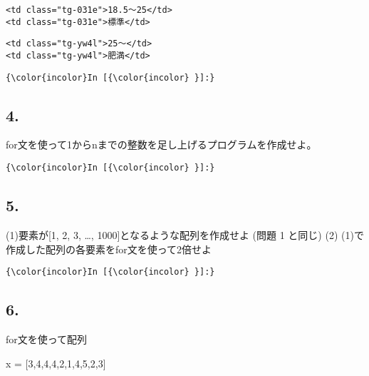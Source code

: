\documentclass[a4paper,dvipdfmx,uplatex]{jsarticle}
\newenvironment{Shaded}{}{}
\newcommand{\FloatTok}[1]{\textcolor[rgb]{0.25,0.63,0.44}{{#1}}}
\newcommand{\NormalTok}[1]{{#1}}
\begin{document}
\begin{verbatim}
<td class="tg-031e">18.5～25</td>
<td class="tg-031e">標準</td>
\end{verbatim}

\begin{verbatim}
<td class="tg-yw4l">25～</td>
<td class="tg-yw4l">肥満</td>
\end{verbatim}

    \begin{Verbatim}[commandchars=\\\{\}]
{\color{incolor}In [{\color{incolor} }]:} 
\end{Verbatim}

    \subsection{4.}\label{section}

for文を使って1からnまでの整数を足し上げるプログラムを作成せよ。

    \begin{Verbatim}[commandchars=\\\{\}]
{\color{incolor}In [{\color{incolor} }]:} 
\end{Verbatim}

    \subsection{5.}\label{section}

(1)要素が{[}1, 2, 3, \ldots{}, 1000{]}となるような配列を作成せよ (問題 1
と同じ) (2) (1)で作成した配列の各要素をfor文を使って2倍せよ

    \begin{Verbatim}[commandchars=\\\{\}]
{\color{incolor}In [{\color{incolor} }]:} 
\end{Verbatim}

    \subsection{6.}\label{section}

for文を使って配列

\begin{Shaded}
\begin{Highlighting}[]
    \NormalTok{x = [}\FloatTok{3}\NormalTok{,}\FloatTok{4}\NormalTok{,}\FloatTok{4}\NormalTok{,}\FloatTok{4}\NormalTok{,}\FloatTok{2}\NormalTok{,}\FloatTok{1}\NormalTok{,}\FloatTok{4}\NormalTok{,}\FloatTok{5}\NormalTok{,}\FloatTok{2}\NormalTok{,}\FloatTok{3}\NormalTok{]}
\end{Highlighting}
\end{Shaded}
\end{document}
